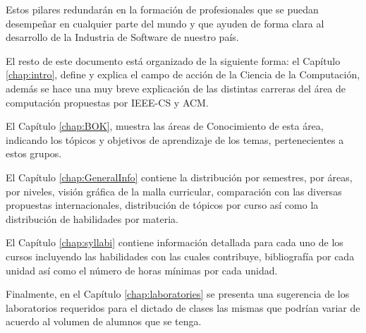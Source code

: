 Estos pilares redundarán en la formación de profesionales que se puedan desempeñar en 
cualquier parte del mundo y que ayuden de forma clara al desarrollo de la Industria 
de Software de nuestro país. 

\OtherKeyStones

El resto de este documento está organizado de la siguiente forma: el Capítulo \ref{chap:intro}, 
define y explica el campo de acción de la Ciencia de la Computación, 
además se hace una muy breve explicación de las distintas carreras del área de 
computación propuestas por IEEE-CS y ACM.




El Capítulo \ref{chap:BOK}, muestra las áreas de Conocimiento de esta área, 
indicando los tópicos y objetivos de aprendizaje de los temas, pertenecientes a estos grupos.

El Capítulo \ref{chap:GeneralInfo} contiene la distribución por semestres, por áreas, por niveles, 
visión gráfica de la malla curricular, comparación con las diversas propuestas internacionales, 
distribución de tópicos por curso así como la distribución de habilidades por materia.

El Capítulo \ref{chap:syllabi} contiene información detallada para cada uno de los cursos 
incluyendo las habilidades con las cuales contribuye, bibliografía por cada unidad así 
como el número de horas mínimas por cada unidad.


Finalmente, en el Capítulo \ref{chap:laboratories} se presenta una sugerencia de los laboratorios 
requeridos para el dictado de clases las mismas que podrían variar de acuerdo al volumen de alumnos que se tenga.

\newpage